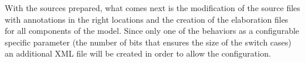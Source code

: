 With the sources prepared, what comes next is the modification of the source files with annotations in the right locations and the creation of the elaboration files for all components of the model. Since only one of the behaviors as a configurable specific parameter (the number of bits that ensures the size of the switch cases) an additional XML file will be created in order to allow the configuration. 

